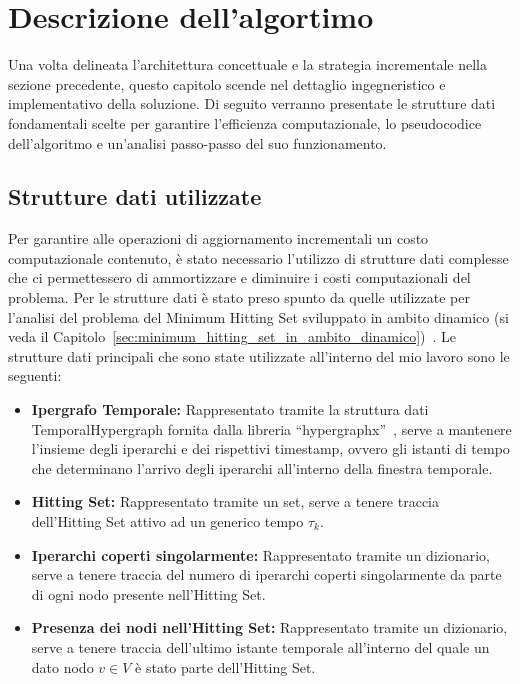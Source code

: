 
\section{Descrizione dell'algortimo}\label{sec:descrizione_algoritmo}

Una volta delineata l'architettura concettuale e la strategia incrementale nella sezione precedente, questo capitolo scende nel dettaglio ingegneristico e implementativo della soluzione.
Di seguito verranno presentate le strutture dati fondamentali scelte per garantire l'efficienza computazionale, lo pseudocodice dell'algoritmo e un'analisi passo-passo del suo funzionamento.

\subsection{Strutture dati utilizzate}

Per garantire alle operazioni di aggiornamento incrementali un costo computazionale contenuto, è stato necessario l'utilizzo di strutture dati complesse che ci permettessero di ammortizzare e diminuire i costi computazionali del problema.
Per le strutture dati è stato preso spunto da quelle utilizzate per l'analisi del problema del Minimum Hitting Set sviluppato in ambito dinamico (si veda il Capitolo~\ref{sec:minimum_hitting_set_in_ambito_dinamico})~\cite{agarwal2020}.
Le strutture dati principali che sono state utilizzate all'interno del mio lavoro sono le seguenti:
\begin{itemize}
    \item \textbf{Ipergrafo Temporale:} Rappresentato tramite la struttura dati TemporalHypergraph fornita dalla libreria ``hypergraphx''~\cite{lotito2023}, serve a mantenere l'insieme degli iperarchi e dei rispettivi timestamp, ovvero gli istanti di tempo che determinano l'arrivo degli iperarchi all'interno della finestra temporale.
    \item \textbf{Hitting Set:} Rappresentato tramite un set, serve a tenere traccia dell'Hitting Set attivo ad un generico tempo $\tau_k$.
    \item \textbf{Iperarchi coperti singolarmente:} Rappresentato tramite un dizionario, serve a tenere traccia del numero di iperarchi coperti singolarmente da parte di ogni nodo presente nell'Hitting Set.
    \item \textbf{Presenza dei nodi nell'Hitting Set:} Rappresentato tramite un dizionario, serve a tenere traccia dell'ultimo istante temporale all'interno del quale un dato nodo $v \in V$ è stato parte dell'Hitting Set.
\end{itemize}

